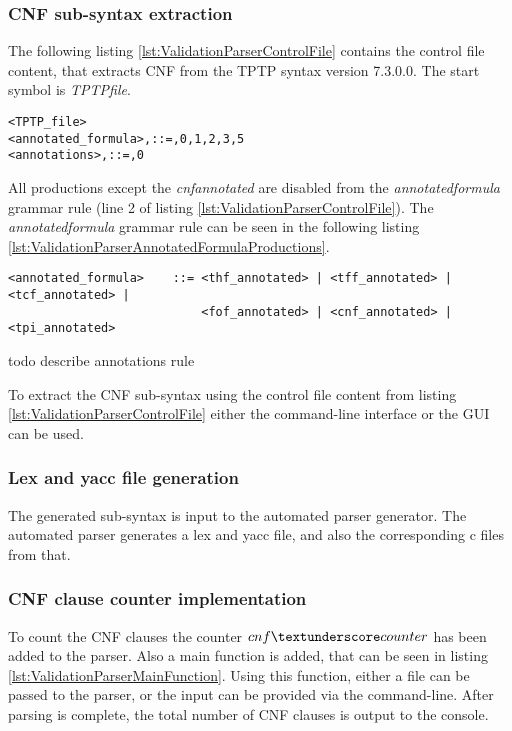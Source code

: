 \subsubsection{\ac{CNF} sub-syntax extraction}\label{sec:ValidationAutomatedParserGenerationBuildingBasicParserSubSyntax}
The following listing \ref{lst:ValidationParserControlFile} contains the control file content, that extracts \ac{CNF} from the TPTP syntax version 7.3.0.0.
The start symbol is \textit{TPTP\textunderscore file}.
\begin{lstlisting}[language = None, caption= Control file to extract \ac{CNF}, label= lst:ValidationParserControlFile]
<TPTP_file>
<annotated_formula>,::=,0,1,2,3,5
<annotations>,::=,0
\end{lstlisting}

All productions except the \textit{cnf\textunderscore annotated} are disabled from the \textit{annotated\textunderscore formula} grammar rule (line 2 of listing \ref{lst:ValidationParserControlFile}).
The \textit{annotated\textunderscore formula} grammar rule can be seen in the following listing \ref{lst:ValidationParserAnnotatedFormulaProductions}.
\begin{lstlisting}[language = None,caption= \textit{annotated\textunderscore formula} production rule, label= lst:ValidationParserAnnotatedFormulaProductions]
<annotated_formula>    ::= <thf_annotated> | <tff_annotated> | <tcf_annotated> |
                           <fof_annotated> | <cnf_annotated> | <tpi_annotated>
\end{lstlisting}

todo describe annotations rule

To extract the \ac{CNF} sub-syntax using the control file content from listing \ref{lst:ValidationParserControlFile} either the command-line interface or the GUI can be used.

\subsubsection{Lex and yacc file generation}\label{sec:ValidationAutomatedParserGenerationBuildingBasicParserGenerateFiles}
The generated sub-syntax is input to the automated parser generator.
The automated parser generates  a lex and yacc file, and also the corresponding c files from that.

\subsubsection{\ac{CNF} clause counter implementation}\label{sec:ValidationAutomatedParserGenerationBuildingBasicParserClauseCounter}
To count the \ac{CNF} clauses the counter $cnf\textunderscore counter$ has been added to the parser.
Also a main function is added, that can be seen in listing \ref{lst:ValidationParserMainFunction}.
Using this function, either a file can be passed to the parser, or the input can be provided via the command-line.
After parsing is complete, the total number of \ac{CNF} clauses is output to the console.


